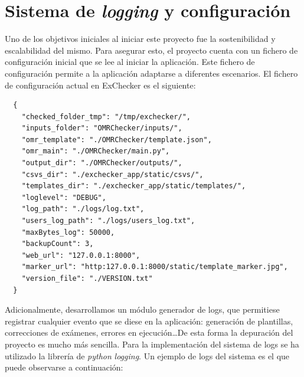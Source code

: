 \documentclass[a4paper, 12pt]{book}
\begin{document}
\section{Sistema de \textit{logging} y configuración} 
\label{sec:sistema_logging}

Uno de los objetivos iniciales al iniciar este proyecto fue la sostenibilidad y 
escalabilidad del mismo. Para asegurar esto, el proyecto cuenta con un fichero
de configuración
inicial que se lee al iniciar la aplicación. Este fichero de configuración permite
a la aplicación adaptarse a diferentes escenarios. El fichero de configuración
actual en ExChecker es el siguiente:

{\footnotesize
\begin{verbatim}
  {
    "checked_folder_tmp": "/tmp/exchecker/",
    "inputs_folder": "OMRChecker/inputs/",
    "omr_template": "./OMRChecker/template.json",
    "omr_main": "./OMRChecker/main.py",
    "output_dir": "./OMRChecker/outputs/",
    "csvs_dir": "./exchecker_app/static/csvs/",
    "templates_dir": "./exchecker_app/static/templates/",
    "loglevel": "DEBUG",
    "log_path": "./logs/log.txt",
    "users_log_path": "./logs/users_log.txt",
    "maxBytes_log": 50000,
    "backupCount": 3,
    "web_url": "127.0.0.1:8000",
    "marker_url": "http:127.0.0.1:8000/static/template_marker.jpg",
    "version_file": "./VERSION.txt"
  }
\end{verbatim}
}

Adicionalmente, desarrollamos un módulo generador de logs, que permitiese registrar
cualquier evento que se diese en la aplicación: generación de plantillas, correcciones
de exámenes, errores en ejecución\dots De esta forma la depuración del proyecto
es mucho más sencilla. Para la implementación del sistema de logs se ha utilizado
la librería de \textit{python} \textit{logging}\cite{logging:documentation}.
Un ejemplo de logs del sistema es el que puede observarse a continuación:
\end{document}
